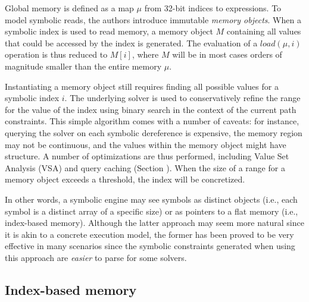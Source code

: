 Global memory is defined as a map $\mu$ from 32-bit indices to expressions. To model symbolic reads, the authors introduce immutable {\em memory objects}. When a symbolic index is used to read memory, a memory object $M$ containing all values that could be accessed by the index is generated. The evaluation of a $load(\mu,i)$ operation is thus reduced to $M[i]$, where $M$ will be in most cases orders of magnitude smaller than the entire memory $\mu$.

Instantiating a memory object still requires finding all possible values for a symbolic index $i$. The underlying solver is used to conservatively refine the range for the value of the index using binary search in the context of the current path constraints. This simple algorithm comes with a number of caveats: for instance, querying the solver on each symbolic dereference is expensive, the memory region may not be continuous, and the values within the memory object might have structure. A number of optimizations are thus performed, including Value Set Analysis (VSA) and query caching (Section \missing). When the size of a range for a memory object exceeds a threshold, the index will be concretized.

\iffalse
\vspace{2em}In other words, a symbolic engine may see symbols as distinct objects (i.e., each symbol is a distinct array of a specific size) or as pointers to a flat memory (i.e., index-based memory). Although the latter approach may seem more natural since it is akin to a concrete execution model, the former has been proved to be very effective in many scenarios since the symbolic constraints generated when using this approach are {\em easier} to parse for some solvers.

\subsection{Index-based memory}

